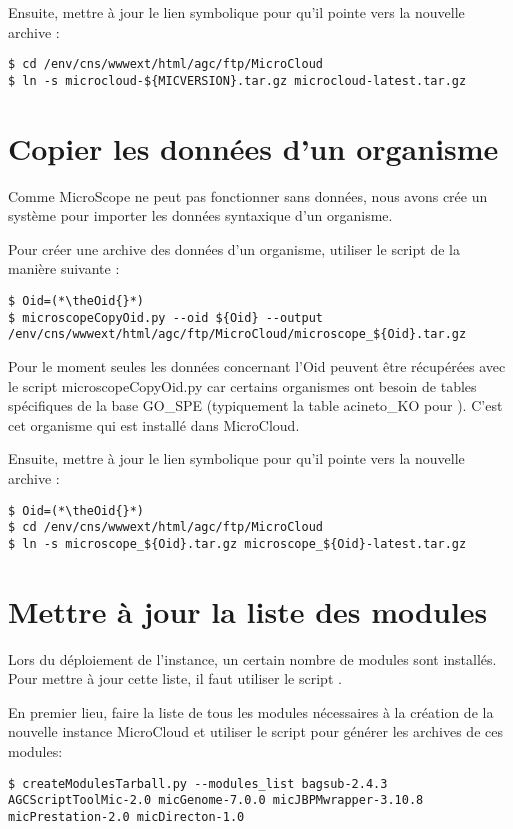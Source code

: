 Ensuite, mettre à jour le lien symbolique pour qu'il pointe vers la nouvelle archive :
\begin{lstlisting}[style=bash]
$ cd /env/cns/wwwext/html/agc/ftp/MicroCloud
$ ln -s microcloud-${MICVERSION}.tar.gz microcloud-latest.tar.gz
\end{lstlisting}

\section{Copier les données d'un organisme} \label{sec:nouvelle_donne_organisme}

Comme MicroScope ne peut pas fonctionner sans données, nous avons crée un système
pour importer les données syntaxique d'un organisme.

Pour créer une archive des données d'un organisme, utiliser le script  de la manière suivante :
\begin{lstlisting}[style=bash]
$ Oid=(*\theOid{}*)
$ microscopeCopyOid.py --oid ${Oid} --output /env/cns/wwwext/html/agc/ftp/MicroCloud/microscope_${Oid}.tar.gz
\end{lstlisting}

\begin{mycolorbox}
    Pour le moment seules les données concernant l'Oid \theOid{} peuvent être récupérées avec le script microscopeCopyOid.py car certains organismes ont besoin de tables spécifiques de la base GO\_SPE (typiquement la table acineto\_KO pour \theOrg{}).
    C'est cet organisme qui est installé dans MicroCloud.
\end{mycolorbox}

Ensuite, mettre à jour le lien symbolique pour qu'il pointe vers la nouvelle archive :
\begin{lstlisting}[style=bash]
$ Oid=(*\theOid{}*)
$ cd /env/cns/wwwext/html/agc/ftp/MicroCloud
$ ln -s microscope_${Oid}.tar.gz microscope_${Oid}-latest.tar.gz
\end{lstlisting}

\section{Mettre à jour la liste des modules} \label{sec:nouvelle_liste_modules}

Lors du déploiement de l'instance, un certain nombre de modules sont installés.
Pour mettre à jour cette liste, il faut utiliser le script .

En premier lieu, faire la liste de tous les modules nécessaires à la création de la nouvelle instance MicroCloud et utiliser
le script  pour générer les archives de ces modules:
\begin{lstlisting}[style=bash]
$ createModulesTarball.py --modules_list bagsub-2.4.3 AGCScriptToolMic-2.0 micGenome-7.0.0 micJBPMwrapper-3.10.8 micPrestation-2.0 micDirecton-1.0
\end{lstlisting}

